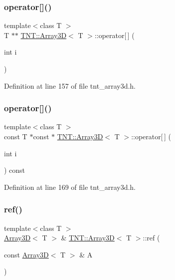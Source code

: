 \subsubsection{\texorpdfstring{operator[]()}{operator[]()}\hspace{0.1cm}{\footnotesize\ttfamily [1/2]}}
{\footnotesize\ttfamily template$<$class T $>$ \\
T $\ast$$\ast$ \hyperlink{classTNT_1_1Array3D}{T\+N\+T\+::\+Array3D}$<$ T $>$\+::operator\mbox{[}$\,$\mbox{]} (\begin{DoxyParamCaption}\item[{int}]{i }\end{DoxyParamCaption})\hspace{0.3cm}{\ttfamily [inline]}}



Definition at line 157 of file tnt\+\_\+array3d.\+h.

\mbox{\label{classTNT_1_1Array3D_add71da16792b166caa02f3d085e86af6}} 
\subsubsection{\texorpdfstring{operator[]()}{operator[]()}\hspace{0.1cm}{\footnotesize\ttfamily [2/2]}}
{\footnotesize\ttfamily template$<$class T $>$ \\
const T $\ast$const  $\ast$ \hyperlink{classTNT_1_1Array3D}{T\+N\+T\+::\+Array3D}$<$ T $>$\+::operator\mbox{[}$\,$\mbox{]} (\begin{DoxyParamCaption}\item[{int}]{i }\end{DoxyParamCaption}) const\hspace{0.3cm}{\ttfamily [inline]}}



Definition at line 169 of file tnt\+\_\+array3d.\+h.

\mbox{\label{classTNT_1_1Array3D_aded40455c8a0b48c3c3d0688ea90180a}} 
\subsubsection{\texorpdfstring{ref()}{ref()}}
{\footnotesize\ttfamily template$<$class T $>$ \\
\hyperlink{classTNT_1_1Array3D}{Array3D}$<$ T $>$ \& \hyperlink{classTNT_1_1Array3D}{T\+N\+T\+::\+Array3D}$<$ T $>$\+::ref (\begin{DoxyParamCaption}\item[{const \hyperlink{classTNT_1_1Array3D}{Array3D}$<$ T $>$ \&}]{A }\end{DoxyParamCaption})\hspace{0.3cm}{\ttfamily [inline]}}



